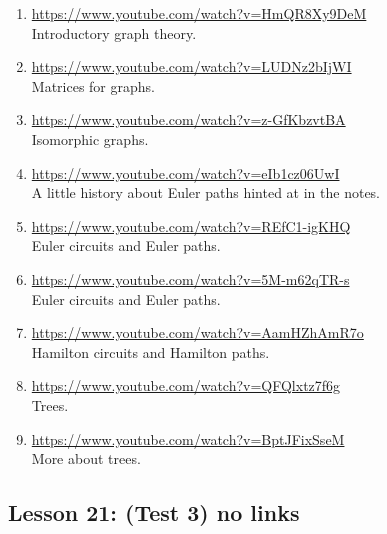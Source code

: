 \documentclass[11pt]{amsart}
\begin{document}
\begin{enumerate}

\item \url{https://www.youtube.com/watch?v=HmQR8Xy9DeM}\\
Introductory graph theory.\\[5pt]


\item \url{https://www.youtube.com/watch?v=LUDNz2bIjWI}\\
Matrices for graphs.\\[5pt]


\item \url{https://www.youtube.com/watch?v=z-GfKbzvtBA}\\
Isomorphic graphs.\\[5pt]


\item \url{https://www.youtube.com/watch?v=eIb1cz06UwI}\\
A little history about Euler paths hinted at in the notes.\\[5pt]



\item \url{https://www.youtube.com/watch?v=REfC1-igKHQ}\\
Euler circuits and Euler paths.\\[5pt]



\item \url{https://www.youtube.com/watch?v=5M-m62qTR-s}\\
Euler circuits and Euler paths.\\[5pt]


\item \url{https://www.youtube.com/watch?v=AamHZhAmR7o}\\
Hamilton circuits and Hamilton paths.\\[5pt]


\item \url{https://www.youtube.com/watch?v=QFQlxtz7f6g}\\
Trees.\\[5pt]


\item \url{https://www.youtube.com/watch?v=BptJFixSseM}\\
More about trees.\\[5pt]


\end{enumerate}

\subsection{Lesson 21: (Test 3) no links}
\end{document}
